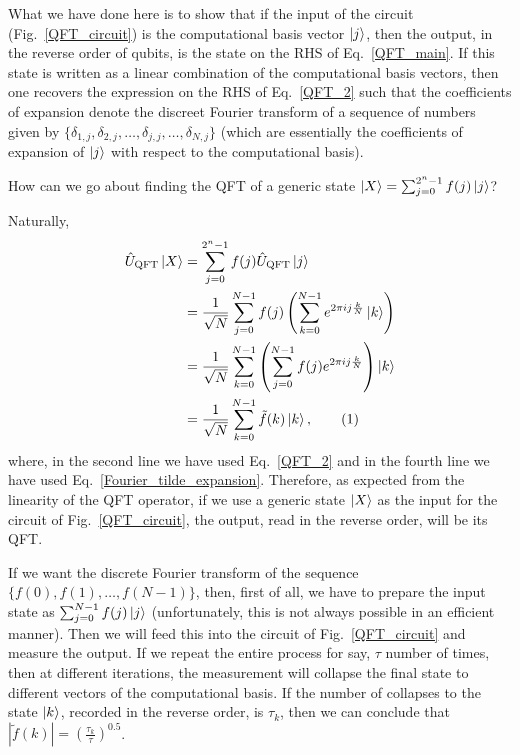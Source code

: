 \documentclass[12pt,oneside]{book}
\newcommand\numberthis{\addtocounter{equation}{1}\tag{\theequation}}
\begin{document}
What we have done here is to show that if the input of the circuit (Fig.~\ref{QFT_circuit}) is the computational basis vector $\ket{j}$, then the output, in the reverse order of qubits, is the state on the RHS of Eq.~\ref{QFT_main}. If this state is written as a linear combination of the computational basis vectors, then one recovers the expression on the RHS of Eq.~\ref{QFT_2} such that the coefficients of expansion denote the discreet Fourier transform of a sequence of numbers given by $\{\delta_{1,j}, \delta_{2,j}, \hdots, \delta_{j,j},\hdots,\delta_{N,j}\}$ (which are essentially the coefficients of expansion of $\ket{j}$ with respect to the computational basis).

How can we go about finding the QFT of a generic state $\ket{X}=\sum_{j=0}^{2^n-1} f(j)\ket{j}$? 

Naturally,
\begin{align*}\label{QFT_generic}
    \hat{U}_{\mathrm{QFT}}\ket{X} &{}= \sum_{j=0}^{2^n-1} f(j) \hat{U}_{\mathrm{QFT}} \ket{j}\\
    &{}=\frac{1}{\sqrt{N}} \sum_{j=0}^{N-1} f(j) \left(\sum_{k=0}^{N-1}e^{2\pi ij\frac{k}{N}}\ket{k}\right)\\
    &{} = \frac{1}{\sqrt{N}} \sum_{k=0}^{N-1} \left( \sum_{j=0}^{N-1} f(j) e^{2\pi ij\frac{k}{N}}\right) \ket{k}\\
    &{} = \frac{1}{\sqrt{N}} \sum_{k=0}^{N-1} \tilde{f}(k)\ket{k},\numberthis
\end{align*}
where, in the second line we have used Eq.~\ref{QFT_2} and in the fourth line we have used Eq.~\ref{Fourier_tilde_expansion}. Therefore, as expected from the linearity of the QFT operator, if we use a generic state $\ket{X}$ as the input for the circuit of Fig.~\ref{QFT_circuit}, the output, read in the reverse order, will be its QFT.

If we want the discrete Fourier transform of the sequence $\{f(0),f(1),\hdots,f(N-1)\}$, then, first of all, we have to prepare the input state as $\sum_{j=0}^{N-1}f(j)\ket{j}$ (unfortunately, this is not always possible in an efficient manner). Then we will feed this into the circuit of Fig.~\ref{QFT_circuit} and measure the output. If we repeat the entire process for say, $\tau$ number of times, then at different iterations, the measurement will collapse the final state to different vectors of the computational basis.
%
If the number of collapses to the state $\ket{k}$, recorded in the reverse order, is $\tau_k$, then we can conclude that $|\tilde{f}(k)|=\left(\frac{\tau_k}{\tau}\right)^{0.5}$.
\end{document}
